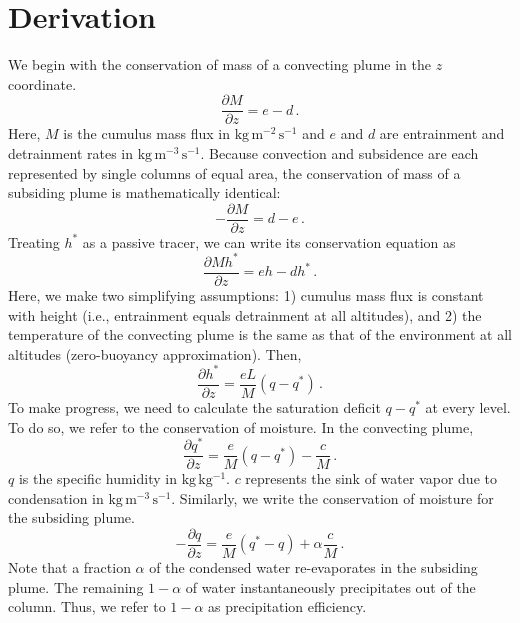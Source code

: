 \documentclass{article}
\begin{document}
\section{Derivation}
We begin with the conservation of mass of a convecting plume in the $z$ coordinate.
\begin{equation}
\frac{\partial M}{\partial z} = e - d \, .
\end{equation}
Here, $M$ is the cumulus mass flux in $\mathrm{kg\,m^{-2}\,s^{-1}}$ and $e$ and $d$ are entrainment and detrainment rates in $\mathrm{kg\,m^{-3}\,s^{-1}}$. Because convection and subsidence are each represented by single columns of equal area, the conservation of mass of a subsiding plume is mathematically identical:
\begin{equation}
-\frac{\partial M}{\partial z} = d - e \, .
\end{equation}
Treating $h^*$ as a passive tracer, we can write its conservation equation as
\begin{equation}
\frac{\partial Mh^*}{\partial z} = eh - dh^* \, .
\end{equation}
Here, we make two simplifying assumptions: 1) cumulus mass flux is constant with height (i.e., entrainment equals detrainment at all altitudes), and 2) the temperature of the convecting plume is the same as that of the environment at all altitudes (zero-buoyancy approximation). Then,
\begin{equation}
\frac{\partial h^*}{\partial z} = \frac{eL}{M}(q - q^*) \, .
\end{equation}
To make progress, we need to calculate the saturation deficit $q - q^*$ at every level. To do so, we refer to the conservation of moisture. In the convecting plume,
\begin{equation}
\frac{\partial q^*}{\partial z} = \frac{e}{M}(q - q^*) - \frac{c}{M} \, .
\end{equation}
$q$ is the specific humidity in $\mathrm{kg\,kg^{-1}}$. $c$ represents the sink of water vapor due to condensation in $\mathrm{kg\,m^{-3}\,s^{-1}}$. Similarly, we write the conservation of moisture for the subsiding plume.
\begin{equation}
-\frac{\partial q}{\partial z} = \frac{e}{M}(q^* - q) + \alpha\frac{c}{M} \, .
\end{equation}
Note that a fraction $\alpha$ of the condensed water re-evaporates in the subsiding plume. The remaining $1-\alpha$ of water instantaneously precipitates out of the column. Thus, we refer to $1-\alpha$ as precipitation efficiency.
\end{document}
